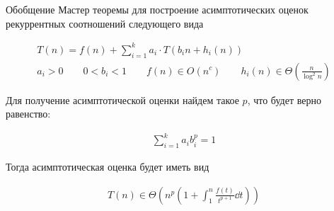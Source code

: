 
Обобщение Мастер теоремы для построение асимптотических оценок рекуррентных
соотношений следующего вида

\begin{align*}
  T(n) = f(n) + \sum_{i = 1}^{k} a_{i} \cdot T(b_{i} n + h_{i}(n))\\
  a_{i} > 0 \qquad
  0 < b_{i} < 1 \qquad
  f(n) \in O(n^{c}) \qquad
  h_{i}(n) \in \Theta \left(\frac{n}{\log^{2} n}\right)
\end{align*}

Для получение асимптотической оценки найдем такое \(p\), что будет верно
равенство:

\begin{align*}
  \sum_{i = 1}^{k} a_{i} b_{i}^{p} = 1
\end{align*}

Тогда асимптотическая оценка будет иметь вид

\begin{align*}
  T(n) \in \Theta \left(
    n^{p} \left( 1 + \int_{1}^{n} \frac{f(t)}{t^{p + 1}} \dd t \right)
  \right)
\end{align*}
